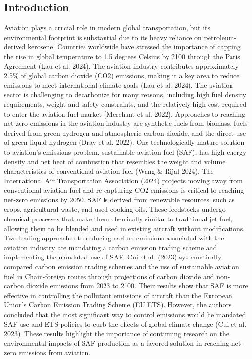 \documentclass[12pt]{article}
\begin{document}
\begin{Appendix}
\section{Introduction}
Aviation plays a crucial role in modern global transportation, but its environmental footprint is substantial due to its heavy reliance on petroleum-derived kerosene. Countries worldwide have stressed the importance of capping the rise in global temperature to 1.5 degrees Celsius by 2100 through the Paris Agreement (Lau et al. 2024). The aviation industry contributes approximately 2.5\% of global carbon dioxide (CO2) emissions, making it a key area to reduce emissions to meet international climate goals (Lau et al. 2024). The aviation sector is challenging to decarbonize for many reasons, including high fuel density requirements, weight and safety constraints, and the relatively high cost required to enter the aviation fuel market (Merchant et al. 2022). Approaches to reaching net-zero emissions in the aviation industry are synthetic fuels from biomass, fuels derived from green hydrogen and atmospheric carbon dioxide, and the direct use of green liquid hydrogen (Dray et al. 2022). One technologically mature solution to aviation’s emissions problem, sustainable aviation fuel (SAF), has high energy density and net heat of combustion that resembles the weight and volume characteristics of conventional aviation fuel (Wang & Rijal 2024).  
The International Air Transportation Association (2024) projects moving away from conventional aviation fuel and re-capturing CO2 emissions is critical to reaching net-zero emissions by 2050. SAF is derived from renewable resources, such as crops, agricultural waste, and used cooking oils. These feedstocks undergo chemical processes that make them chemically similar to traditional jet fuel, allowing them to be blended and used in existing aircraft without modifications. 
Two leading approaches to reducing carbon emissions associated with the aviation industry are mandating a carbon emission trading scheme and implementing the mandated use of SAF. Cui et al. (2023) systematically compared carbon emission trading schemes and the use of sustainable aviation fuel in Chain-foreign routes through projections of carbon dioxide and non-carbon dioxide emissions from 2023 to 2100. Their results show that SAF is more effective in controlling the pollutant emissions of aircraft than the European Union’s Carbon Emission Trading Scheme (EU ETS). However, the authors concluded that the most significant way to control emissions would be mandated SAF use and ETS policies to curb the effects of global climate change (Cui et al. 2023). These results highlight the importance of continuing research on the environmental impacts of SAF production as a favored solution in reaching net-zero emissions from aviation. 


\end{Appendix}
\end{document}
